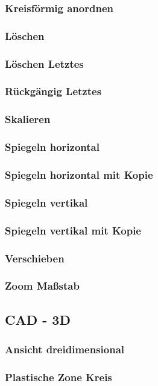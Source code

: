 \documentclass[14pt,a4paper]{book}
\begin{document}
			\subsubsection{Kreisförmig anordnen}
			\subsubsection{Löschen}
			\subsubsection{Löschen Letztes}
			\subsubsection{Rückgängig Letztes}
			\subsubsection{Skalieren}
			\subsubsection{Spiegeln horizontal}
			\subsubsection{Spiegeln horizontal mit Kopie}
			\subsubsection{Spiegeln vertikal}
			\subsubsection{Spiegeln vertikal mit Kopie}
			\subsubsection{Verschieben}
			\subsubsection{Zoom Maßstab}
		\subsection{CAD - 3D}
			\subsubsection{Ansicht dreidimensional}
			\subsubsection{Plastische Zone Kreis}
\end{document}
